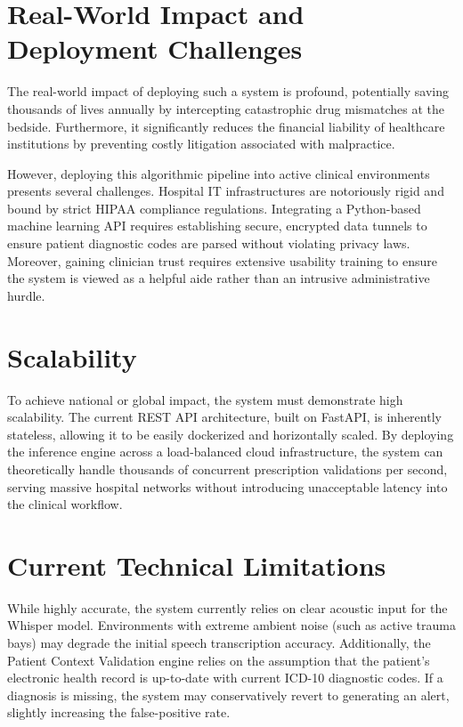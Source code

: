 \documentclass[12pt,a4paper]{report}
\begin{document}
\section{Real-World Impact and Deployment Challenges}
The real-world impact of deploying such a system is profound, potentially saving thousands of lives annually by intercepting catastrophic drug mismatches at the bedside. Furthermore, it significantly reduces the financial liability of healthcare institutions by preventing costly litigation associated with malpractice.

However, deploying this algorithmic pipeline into active clinical environments presents several challenges. Hospital IT infrastructures are notoriously rigid and bound by strict HIPAA compliance regulations. Integrating a Python-based machine learning API requires establishing secure, encrypted data tunnels to ensure patient diagnostic codes are parsed without violating privacy laws. Moreover, gaining clinician trust requires extensive usability training to ensure the system is viewed as a helpful aide rather than an intrusive administrative hurdle.

\section{Scalability}
To achieve national or global impact, the system must demonstrate high scalability. The current REST API architecture, built on FastAPI, is inherently stateless, allowing it to be easily dockerized and horizontally scaled. By deploying the inference engine across a load-balanced cloud infrastructure, the system can theoretically handle thousands of concurrent prescription validations per second, serving massive hospital networks without introducing unacceptable latency into the clinical workflow.

\section{Current Technical Limitations}
While highly accurate, the system currently relies on clear acoustic input for the Whisper model. Environments with extreme ambient noise (such as active trauma bays) may degrade the initial speech transcription accuracy. Additionally, the Patient Context Validation engine relies on the assumption that the patient's electronic health record is up-to-date with current ICD-10 diagnostic codes. If a diagnosis is missing, the system may conservatively revert to generating an alert, slightly increasing the false-positive rate.
\end{document}
